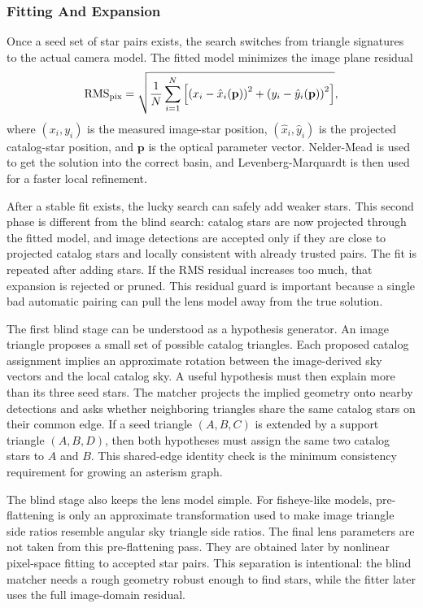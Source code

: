 \documentclass[11pt]{article}
\begin{document}
\subsubsection{Fitting And Expansion}

Once a seed set of star pairs exists, the search switches from triangle
signatures to the actual camera model. The fitted model minimizes the image
plane residual
\[
  {\rm RMS}_{\rm pix}
  =
  \sqrt{
    \frac{1}{N}
    \sum_{i=1}^N
    \left[
      \left(x_i - \hat{x}_i(\mathbf{p})\right)^2
      +
      \left(y_i - \hat{y}_i(\mathbf{p})\right)^2
    \right]
  },
\]
where \((x_i,y_i)\) is the measured image-star position,
\((\hat{x}_i,\hat{y}_i)\) is the projected catalog-star position, and
\(\mathbf{p}\) is the optical parameter vector. Nelder-Mead is used to get the
solution into the correct basin, and Levenberg-Marquardt is then used for a
faster local refinement.

After a stable fit exists, the lucky search can safely add weaker stars. This
second phase is different from the blind search: catalog stars are now
projected through the fitted model, and image detections are accepted only if
they are close to projected catalog stars and locally consistent with already
trusted pairs. The fit is repeated after adding stars. If the RMS residual
increases too much, that expansion is rejected or pruned. This residual guard
is important because a single bad automatic pairing can pull the lens model
away from the true solution.

The first blind stage can be understood as a hypothesis generator. An image
triangle proposes a small set of possible catalog triangles. Each proposed
catalog assignment implies an approximate rotation between the image-derived
sky vectors and the local catalog sky. A useful hypothesis must then explain
more than its three seed stars. The matcher projects the implied geometry onto
nearby detections and asks whether neighboring triangles share the same catalog
stars on their common edge. If a seed triangle \((A,B,C)\) is extended by a
support triangle \((A,B,D)\), then both hypotheses must assign the same two
catalog stars to \(A\) and \(B\). This shared-edge identity check is the
minimum consistency requirement for growing an asterism graph.

The blind stage also keeps the lens model simple. For fisheye-like models,
pre-flattening is only an approximate transformation used to make image
triangle side ratios resemble angular sky triangle side ratios. The final
lens parameters are not taken from this pre-flattening pass. They are obtained
later by nonlinear pixel-space fitting to accepted star pairs. This separation
is intentional: the blind matcher needs a rough geometry robust enough to find
stars, while the fitter later uses the full image-domain residual.
\end{document}
